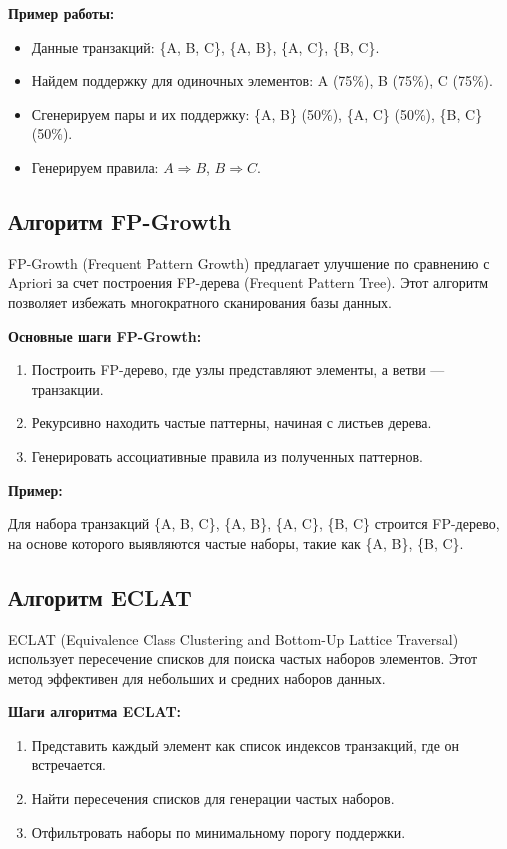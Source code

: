 \textbf{Пример работы:}

\begin{itemize}
    \item Данные транзакций: \{A, B, C\}, \{A, B\}, \{A, C\}, \{B, C\}.
    \item Найдем поддержку для одиночных элементов: A (75\%), B (75\%), C (75\%).
    \item Сгенерируем пары и их поддержку: \{A, B\} (50\%), \{A, C\} (50\%), \{B, C\} (50\%).
    \item Генерируем правила: $A \Rightarrow B$, $B \Rightarrow C$.
\end{itemize}

\subsection{Алгоритм FP-Growth}

FP-Growth (Frequent Pattern Growth) предлагает улучшение по сравнению с Apriori за счет построения FP-дерева (Frequent Pattern Tree). Этот алгоритм позволяет избежать многократного сканирования базы данных.

\textbf{Основные шаги FP-Growth:}
\begin{enumerate}
    \item Построить FP-дерево, где узлы представляют элементы, а ветви — транзакции.
    \item Рекурсивно находить частые паттерны, начиная с листьев дерева.
    \item Генерировать ассоциативные правила из полученных паттернов.
\end{enumerate}

\textbf{Пример:}

Для набора транзакций \{A, B, C\}, \{A, B\}, \{A, C\}, \{B, C\} строится FP-дерево, на основе которого выявляются частые наборы, такие как \{A, B\}, \{B, C\}.

\subsection{Алгоритм ECLAT}

ECLAT (Equivalence Class Clustering and Bottom-Up Lattice Traversal) использует пересечение списков для поиска частых наборов элементов. Этот метод эффективен для небольших и средних наборов данных.

\textbf{Шаги алгоритма ECLAT:}
\begin{enumerate}
    \item Представить каждый элемент как список индексов транзакций, где он встречается.
    \item Найти пересечения списков для генерации частых наборов.
    \item Отфильтровать наборы по минимальному порогу поддержки.
\end{enumerate}


